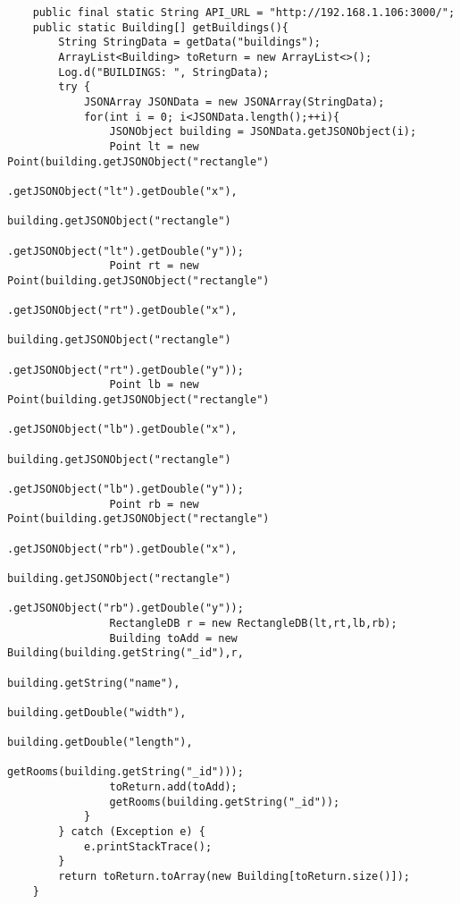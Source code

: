 \begin{lstlisting}
    public final static String API_URL = "http://192.168.1.106:3000/";
    public static Building[] getBuildings(){
        String StringData = getData("buildings");
        ArrayList<Building> toReturn = new ArrayList<>();
        Log.d("BUILDINGS: ", StringData);
        try {
            JSONArray JSONData = new JSONArray(StringData);
            for(int i = 0; i<JSONData.length();++i){
                JSONObject building = JSONData.getJSONObject(i);
                Point lt = new Point(building.getJSONObject("rectangle")
                                             .getJSONObject("lt").getDouble("x"),
                                     building.getJSONObject("rectangle")
                                             .getJSONObject("lt").getDouble("y"));
                Point rt = new Point(building.getJSONObject("rectangle")
                                             .getJSONObject("rt").getDouble("x"),
                                     building.getJSONObject("rectangle")
                                             .getJSONObject("rt").getDouble("y"));
                Point lb = new Point(building.getJSONObject("rectangle")
                                             .getJSONObject("lb").getDouble("x"),
                                     building.getJSONObject("rectangle")
                                             .getJSONObject("lb").getDouble("y"));
                Point rb = new Point(building.getJSONObject("rectangle")
                                             .getJSONObject("rb").getDouble("x"),
                                     building.getJSONObject("rectangle")
                                             .getJSONObject("rb").getDouble("y"));
                RectangleDB r = new RectangleDB(lt,rt,lb,rb);
                Building toAdd = new Building(building.getString("_id"),r,
                                              building.getString("name"),
                                              building.getDouble("width"),
                                              building.getDouble("length"),
                                              getRooms(building.getString("_id")));
                toReturn.add(toAdd);
                getRooms(building.getString("_id"));
            }
        } catch (Exception e) {
            e.printStackTrace();
        }
        return toReturn.toArray(new Building[toReturn.size()]);
    }


\end{lstlisting}
